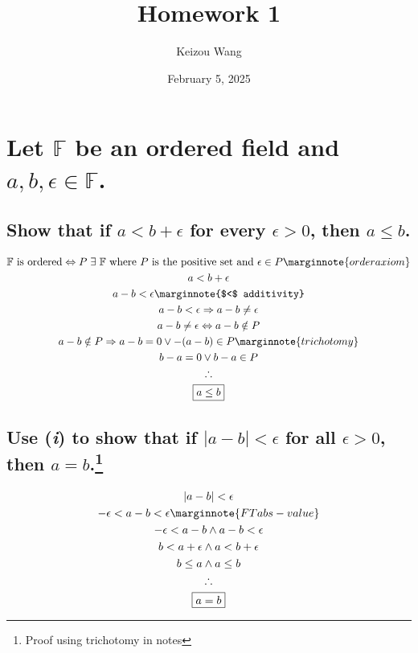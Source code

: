 \documentclass[letterpaper]{article}
\title{Homework 1}
\author{Keizou Wang}
\date{February 5, 2025}
\begin{document}
\maketitle

\section{Let $\mathbb{F}$ be an ordered field and $a, b, \epsilon \in \mathbb{F}$.}
\subsection{Show that if $a < b + \epsilon$ for every $\epsilon > 0$, then $a \leq b$.}
\begin{gather*}
\mathbb{F}
\text{ is ordered} \Leftrightarrow
P \hspace{3pt} \exists \hspace{3pt} \mathbb{F}
\text{ where $P$ is the positive set and } \epsilon \in P \marginnote{order axiom} \\
a<b+\epsilon \\
a-b<\epsilon \marginnote{$<$ additivity} \\
a-b<\epsilon \Rightarrow a-b\neq\epsilon \\
a-b\neq\epsilon \Leftrightarrow a-b\notin P \\
a-b\notin P \Rightarrow a-b=0 \lor -(a-b) \in P \marginnote{trichotomy} \\
b-a=0 \lor b-a \in P \\
\therefore \\
\boxed{a \leq b}
\end{gather*}
\subsection{Use (\textit{i}) to show that if $|a-b|<\epsilon$ for all $\epsilon>0$, then $a=b$.\protect\footnote{Proof using trichotomy in notes}}
\begin{gather*}
|a-b|<\epsilon \\
-\epsilon < a-b < \epsilon \marginnote{FT abs-value} \\
-\epsilon < a-b \land a-b < \epsilon \\
b<a+\epsilon \land a<b+\epsilon \\
b\leq a \land a\leq b \\
\therefore \\
\boxed{a = b}
\end{gather*}
\end{document}
